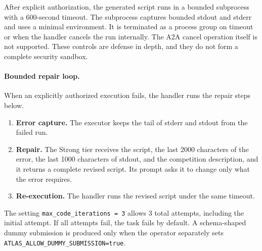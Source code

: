 \documentclass{article}
\begin{document}
After explicit authorization, the generated script runs in a bounded subprocess with a 600-second timeout. The subprocess captures bounded stdout and stderr and uses a minimal environment. It is terminated as a process group on timeout or when the handler cancels the run internally. The A2A cancel operation itself is not supported. These controls are defense in depth, and they do not form a complete security sandbox.

\paragraph{Bounded repair loop.}
When an explicitly authorized execution fails, the handler runs the repair steps below.
\begin{enumerate}[leftmargin=*,nosep]
  \item \textbf{Error capture.} The executor keeps the tail of stderr and stdout from the failed run.
  \item \textbf{Repair.} The Strong tier receives the script, the last \num{2000} characters of the error, the last \num{1000} characters of stdout, and the competition description, and it returns a complete revised script. Its prompt asks it to change only what the error requires.
  \item \textbf{Re-execution.} The handler runs the revised script under the same timeout.
\end{enumerate}
The setting \texttt{max\_code\_iterations\,=\,3} allows 3 total attempts, including the initial attempt. If all attempts fail, the task fails by default. A schema-shaped dummy submission is produced only when the operator separately sets \texttt{ATLAS\_ALLOW\_DUMMY\_SUBMISSION=true}.
\end{document}
